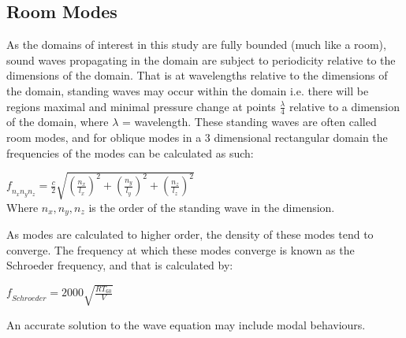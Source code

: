 \subsection{Room Modes}
As the domains of interest in this study are fully bounded (much like a room), sound waves propagating in the domain are subject to periodicity relative to the dimensions of the domain. That is at wavelengths relative to the dimensions of the domain, standing waves may occur within the domain i.e. there will be regions maximal and minimal pressure change at points $\frac{\lambda}{4}$ relative to a dimension of the domain, where $\lambda$ = wavelength. These standing waves are often called room modes, and for oblique modes in a 3 dimensional rectangular domain the frequencies of the  modes can be calculated as such:\\
\begin{center}
$\textit{f}_{n_xn_yn_z} = \frac{c}{2} \sqrt{\left(\frac{n_x}{l_x}\right)^2 + \left(\frac{n_y}{l_y}\right)^2 + \left(\frac{n_z}{l_z}\right)^2} $\\
Where $n_x, n_y, n_z$ is the order of the standing wave in the dimension.\\
\end{center} 

As modes are calculated to higher order, the density of these modes tend to converge. The frequency at which these modes converge is known as the Schroeder frequency, and that is calculated by:\\
\begin{center}
$ \textit{f}_{Schroeder} = 2000 \sqrt{\frac{RT_{60}}{V}} $\\
\end{center}
An accurate solution to the wave equation may include modal behaviours.


